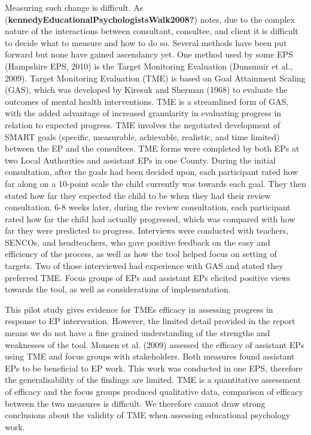 \documentclass[
  english,
  man]{apa}
\begin{document}
Measuring such change is difficult. As (\textbf{kennedyEducationalPsychologistsWalk2008?}) notes, due to the complex nature of the interactions between consultant, consultee, and client it is difficult to decide what to measure and how to do so. Several methods have been put forward but none have gained ascendancy yet. One method used by some EPS (Hampshire EPS, 2010) is the Target Monitoring Evaluation (Dunsmuir et al., 2009). Target Monitoring Evaluation (TME) is based on Goal Attainment Scaling (GAS), which was developed by Kiresuk and Sherman (1968) to evaluate the outcomes of mental health interventions. TME is a streamlined form of GAS, with the added advantage of increased granularity in evaluating progress in relation to expected progress. TME involves the negotiated development of SMART goals (specific, measurable, achievable, realistic, and time limited) between the EP and the consultees. TME forms were completed by both EPs at two Local Authorities and assistant EPs in one County. During the initial consultation, after the goals had been decided upon, each participant rated how far along on a 10-point scale the child currently was towards each goal. They then stated how far they expected the child to be when they had their review consultation. 6-8 weeks later, during the review consultation, each participant rated how far the child had actually progressed, which was compared with how far they were predicted to progress. Interviews were conducted with teachers, SENCOs, and headteachers, who gave positive feedback on the easy and efficiency of the process, as well as how the tool helped focus on setting of targets. Two of those interviewed had experience with GAS and stated they preferred TME. Focus groups of EPs and assistant EPs elicited positive views towards the tool, as well as considerations of implementation.

This pilot study gives evidence for TMEs efficacy in assessing progress in response to EP intervention. However, the limited detail provided in the report means we do not have a fine grained understanding of the strengths and weaknesses of the tool. Monsen et al. (2009) assessed the efficacy of assistant EPs using TME and focus groups with stakeholders. Both measures found assistant EPs to be beneficial to EP work. This work was conducted in one EPS, therefore the generalisability of the findings are limited. TME is a quantitative assessment of efficacy and the focus groups produced qualitative data, comparison of efficacy between the two measures is difficult. We therefore cannot draw strong conclusions about the validity of TME when assessing educational psychology work.
\end{document}
